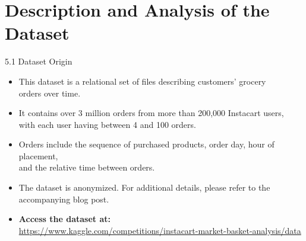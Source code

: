 \documentclass{beamer}
\begin{document}
\section{Description and Analysis of the Dataset}

\begin{frame}{5.1 Dataset Origin}
    \begin{itemize}
        \item This dataset is a relational set of files describing customers' grocery \\
              orders over time.
        \item It contains over 3 million orders from more than 200,000 Instacart users,\\ 
              with each user having between 4 and 100 orders.
        \item Orders include the sequence of purchased products, order day, hour of placement,\\
              and the relative time between orders.
        \item The dataset is anonymized. For additional details, please refer to the \\
              accompanying blog post.
        \item \textbf{Access the dataset at:} 
        \\\url{https://www.kaggle.com/competitions/instacart-market-basket-analysis/data}
    \end{itemize}
\end{frame}
\end{document}
